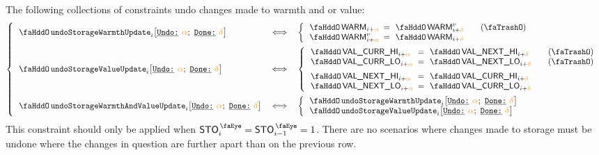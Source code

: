 The following collections of constraints undo changes made to warmth and or value:
\[
	\left\{ \begin{array}{lcl}
		\stoUndoWarmthUpdate {i}{\reluo}{\reldo} & \iff &
		\left\{	\begin{array}{lclr}
			\stoWarmth    _{i + \reluo} & \!\!\! = \!\!\! & \stoWarmth\new_{i + \reldo} & \quad (\trash)             \\
			\stoWarmth\new_{i + \reluo} & \!\!\! = \!\!\! & \stoWarmth    _{i + \reldo}     \\
		\end{array}	\right.	\vspace{2mm}	\\
		\stoUndoValueUpdate {i}{\reluo}{\reldo} & \iff &
		\left\{	\begin{array}{lclr}
			\stoCurrValueHi_{i + \reluo} & \!\!\! = \!\!\! & \stoNextValueHi_{i + \reldo}  & \quad (\trash)             \\
			\stoCurrValueLo_{i + \reluo} & \!\!\! = \!\!\! & \stoNextValueLo_{i + \reldo}  & \quad (\trash)\vspace{2mm} \\
			\stoNextValueHi_{i + \reluo} & \!\!\! = \!\!\! & \stoCurrValueHi_{i + \reldo} \\
			\stoNextValueLo_{i + \reluo} & \!\!\! = \!\!\! & \stoCurrValueLo_{i + \reldo} \\
		\end{array}	\right.	\vspace{2mm}	\\
		\stoUndoWarmthAndValueUpdate {i}{\reluo}{\reldo} & \iff &
		\left\{	\begin{array}{lcl}
			\stoUndoWarmthUpdate {i}{\reluo}{\reldo} \\
			\stoUndoValueUpdate  {i}{\reluo}{\reldo} \\
		\end{array}	\right.	\\
	\end{array} \right.
\]
\saNote{} This constraint should only be applied when $\peekStorage_{i} = \peekStorage_{i - 1} = 1$.
There are no scenarios where changes made to storage must be undone where the changes in question are further apart than on the previous row.
